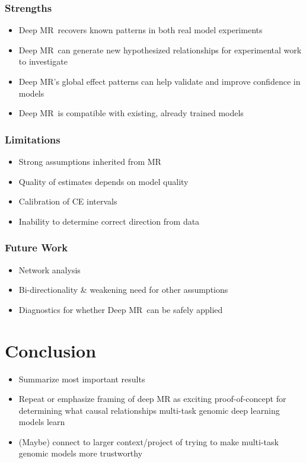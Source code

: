 \documentclass[twoside,11pt]{article}
\newcommand{\method}{{Deep MR}}
\begin{document}
\subsubsection{Strengths}%
\label{ssub:strengths}
\begin{itemize}
	\item \method\ recovers known patterns in both real model experiments
	\item \method\ can generate new hypothesized relationships for experimental work to investigate
	\item \method's global effect patterns can help validate and improve confidence in models
	\item \method\ is compatible with existing, already trained models 
\end{itemize}

\subsubsection{Limitations}%
\label{ssub:limitations}
\begin{itemize}
	\item Strong assumptions inherited from MR
	\item Quality of estimates depends on model quality
	\item Calibration of CE intervals
	\item Inability to determine correct direction from data
\end{itemize}

\subsubsection{Future Work}%
\label{ssub:future_work}
\begin{itemize}
	\item Network analysis
	\item Bi-directionality \& weakening need for other assumptions
	\item Diagnostics for whether \method\ can be safely applied
\end{itemize}

\section{Conclusion}%
\label{sec:conclusion}
\begin{itemize}
	\item Summarize most important results
	\item Repeat or emphasize framing of deep MR as exciting proof-of-concept for determining what causal relationships multi-task genomic deep learning models learn
	\item (Maybe) connect to larger context/project of trying to make multi-task genomic models more trustworthy
\end{itemize}





\newpage

\appendix

\vskip 0.2in

\end{document}
